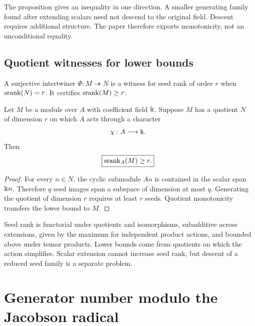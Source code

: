 \begin{hypothesisguide}
The proposition gives an inequality in one direction.  A smaller generating family found after extending scalars need not descend to the original field.  Descent requires additional structure.  The paper therefore exports monotonicity, not an unconditional equality.
\end{hypothesisguide}


\subsection{Quotient witnesses for lower bounds}
\begin{definition}
\label{def:seed-rank-witness}
A surjective intertwiner $\Phi:M\twoheadrightarrow N$ is a witness for seed rank of order $r$ when $\operatorname{srank}(N)=r$.  It certifies $\operatorname{srank}(M)\geq r$.
\end{definition}

\begin{proposition}
\label{prop:scalar-quotient}
Let $M$ be a module over $A$ with coefficient field $\Bbbk$.  Suppose $M$ has a quotient $N$ of dimension $r$ on which $A$ acts through a character
\[
\chi:A\longrightarrow\Bbbk.
\]
Then
\[
\boxed{\operatorname{srank}_A(M)\geq r.}
\]
\end{proposition}

\begin{proof}
For every $n\in N$, the cyclic submodule $An$ is contained in the scalar span $\Bbbk n$.  Therefore $q$ seed images span a subspace of dimension at most $q$.  Generating the quotient of dimension $r$ requires at least $r$ seeds.  Quotient monotonicity transfers the lower bound to $M$.
\end{proof}

\begin{sectionrecap}
Seed rank is functorial under quotients and isomorphisms, subadditive across extensions, given by the maximum for independent product actions, and bounded above under tensor products.  Lower bounds come from quotients on which the action simplifies.  Scalar extension cannot increase seed rank, but descent of a reduced seed family is a separate problem.
\end{sectionrecap}

\section{Generator number modulo the Jacobson radical}



